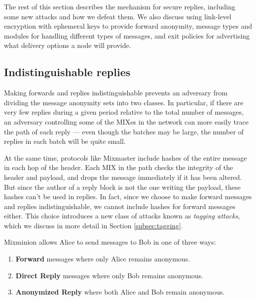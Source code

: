 \documentclass{llncs}
\begin{document}
The rest of this section describes the mechanism for secure replies,
including some new attacks and how we defeat them. We also discuss using
link-level encryption with ephemeral keys to provide forward anonymity,
message types and modules for handling different types of messages, and
exit policies for advertising what delivery options a node will provide.


\subsection{Indistinguishable replies}
\label{subsec:header-swap}

Making forwards and replies indistinguishable prevents an adversary from
dividing the message anonymity sets into two classes. In particular, if
there are very few replies during a given period relative to the total
number of messages, an adversary controlling some of the MIXes in the
network can more easily trace the path of each reply --- even though
the batches may be large, the number of replies in each batch will be
quite small.

At the same time, protocols like Mixmaster include hashes of the entire
message in each hop of the header. Each MIX in the path checks the
integrity of the header and payload, and drops the message immediately
if it has been altered. But since the author of a reply block is not the
one writing the payload, these hashes can't be used in replies. In fact,
since we choose to make forward messages and replies indistinguishable,
we cannot include hashes for forward messages either. This choice
introduces a new class of attacks known as \emph{tagging attacks},
which we discuss in more detail in Section \ref{subsec:tagging}.

Mixminion allows Alice to send messages to Bob in one of three ways:

\begin{enumerate}
\item \textbf{Forward} messages where only Alice remains anonymous.
\item \textbf{Direct Reply} messages where only Bob remains anonymous.
\item \textbf{Anonymized Reply} where both Alice and Bob remain anonymous.
\end{enumerate}
\end{document}
